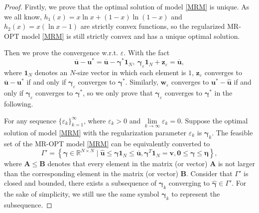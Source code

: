 \documentclass[10pt,a4paper]{amsart}
\begin{document}
\begin{proof}
	Firstly, we prove that the optimal solution of model \cref{MRM} is unique. As we all know, $h_1(x)=x\ln x+(1-x)\ln (1-x)$ and  $h_2(x)=x(\ln x -1)$ are strictly convex functions, so the regularized MR-OPT model \cref{MRM} is still strictly convex and has a unique optimal solution. 

    Then we prove the convergence w.r.t. $\varepsilon$. With the fact
    \begin{equation*}
        \bm{\overline{u}}-\bm{u}^*=\bm{\overline{u}}-\bm{\gamma}^* \bm{1}_N, \ \bm{\gamma}_{\varepsilon} \bm{1}_N + \bm{z}_{\varepsilon} = \bm{\overline{u}}, 
    \end{equation*}
    where $\bm{1}_N$ denotes an $N$-size vector in which each element is $1$, $\bm{z}_{\varepsilon}$ converges to $\bm{\overline{u}}-\bm{u}^*$ if and only if $\bm{\gamma}_{\varepsilon}$ converges to $\bm{\gamma}^*$. 
    Similarly, $\bm{w}_{\varepsilon}$ converges to $\bm{u}^*-\bm{\hat{u}}$ if and only if $\bm{\gamma}_{\varepsilon}$ converges to $\bm{\gamma}^*$, so we only prove that $\bm{\gamma}_{\varepsilon}$ converges to $\bm{\gamma}^*$ in the following. 
     
 For any sequence $\{\varepsilon_k\}_{k=1}^{\infty}$, where $\varepsilon_k>0$ and $\lim\limits_{k\rightarrow \infty} \varepsilon_k=0$. Suppose the optimal solution of model \cref{MRM} with the regularization parameter $\varepsilon_k$ is $\bm{\gamma}_k$. 
 The feasible set of the MR-OPT model \cref{MRM} can be equivalently converted to 
 $$\Gamma' = \left\{\bm{\gamma}\in \mathbb{R}^{N\times N} \mid \bm{\hat{u}}\leq \bm{\gamma}\bm{1}_N \leq  \bm{\overline{u}}, \bm{\gamma}^{T} \bm{1}_N=\bm{v}, \bm{0} \leq \bm{\gamma} \leq \bm{\eta} \right\}, $$
 where $\bm{A} \leq \bm{B}$ denotes that every element in the matrix (or vector) $\bm{A}$ is not larger than the corresponding element in the matrix (or vector) $\bm{B}$. 
 Consider that $\Gamma'$ is closed and bounded, there exists a subsequence of $\bm{\gamma}_k$ converging to $\hat{\bm{\gamma}}\in \Gamma'$. For the sake of simplicity, we still use the same symbol $\bm{\gamma}_k$ to represent the subsequence.
 

\end{proof}
\end{document}
